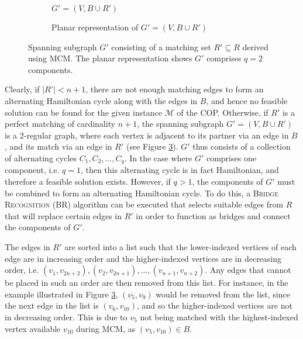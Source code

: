 \documentclass[oribibl]{llncs}
\begin{document}
\begin{figure}	
	\centering
	\begin{subfigure}[h]{0.4\textwidth}
		
		\caption{$G' = (V, B \cup R')$}	
		\label{fig:matching}
	\end{subfigure} \quad
	\begin{subfigure}[h]{0.5\textwidth}
		
		\caption{Planar representation of $G' =(V, B \cup R')$}	
		\label{fig:mps}
	\end{subfigure}
	\caption{Spanning subgraph $G'$ consisting of a matching set $R' \subseteq R$ derived using MCM. The planar representation shows $G'$ comprises $q = 2$ components.}
	\label{fig:matching/mps}
\end{figure}

Clearly, if $|R'| < n+1$, there are not enough matching edges to form an alternating Hamiltonian cycle along with the edges in $B$, and hence no feasible solution can be found for the given instance $\mathcal{M}$ of the COP. Otherwise, if $R'$ is a perfect matching of cardinality $n+1$, the spanning subgraph $G'=(V, B \cup R')$ is a 2-regular graph, where each vertex is adjacent to its partner via an edge in $B$, and its match via an edge in $R'$ (see Figure \ref{fig:matching/mps}). $G'$ thus consists of a collection of alternating cycles $C_1, C_2, ..., C_q$. In the case where $G'$ comprises one component, i.e. $q = 1$, then this alternating cycle is in fact Hamiltonian, and therefore a feasible solution exists. However, if $q > 1$, the components of $G'$ must be combined to form an alternating Hamiltonian cycle. To do this, a \textsc{Bridge Recognition} (BR) algorithm can be executed that selects suitable edges from $R$ that will replace certain edges in $R'$ in order to function as bridges and connect the components of $G'$.

The edges in $R'$ are sorted into a list such that the lower-indexed vertices of each edge are in increasing order and the higher-indexed vertices are in decreasing order, i.e. $(v_1, v_{2n+2}), (v_2, v_{2n+1}), ..., (v_{n+1}, v_{n+2})$. Any edges that cannot be placed in such an order are then removed from this list. For instance, in the example illustrated in Figure \ref{fig:matching/mps}, $(v_5, v_9)$ would be removed from the list, since the next edge in the list is $(v_6, v_{10})$, and so the higher-indexed vertices are not in decreasing order. This is due to $v_5$ not being matched with the highest-indexed vertex available $v_{10}$ during MCM, as $(v_5, v_{10}) \in B$.
\end{document}
